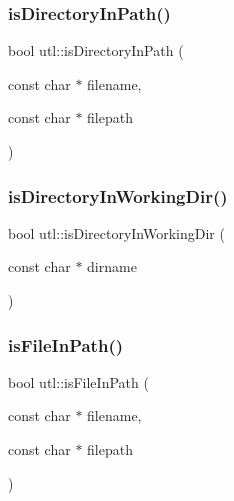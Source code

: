 \mbox{\label{namespaceutl_a974c3394d6d0a5dd2ec596d5eab86c52}} 
\subsubsection{\texorpdfstring{is\+Directory\+In\+Path()}{isDirectoryInPath()}}
{\footnotesize\ttfamily bool utl\+::is\+Directory\+In\+Path (\begin{DoxyParamCaption}\item[{const char $\ast$}]{filename,  }\item[{const char $\ast$}]{filepath }\end{DoxyParamCaption})}

\mbox{\label{namespaceutl_a45a8640044d9ad8216c1495249ce6ed1}} 
\subsubsection{\texorpdfstring{is\+Directory\+In\+Working\+Dir()}{isDirectoryInWorkingDir()}}
{\footnotesize\ttfamily bool utl\+::is\+Directory\+In\+Working\+Dir (\begin{DoxyParamCaption}\item[{const char $\ast$}]{dirname }\end{DoxyParamCaption})}

\mbox{\label{namespaceutl_a65f2cad7adb77020d86898720bde9b9c}} 
\subsubsection{\texorpdfstring{is\+File\+In\+Path()}{isFileInPath()}}
{\footnotesize\ttfamily bool utl\+::is\+File\+In\+Path (\begin{DoxyParamCaption}\item[{const char $\ast$}]{filename,  }\item[{const char $\ast$}]{filepath }\end{DoxyParamCaption})}

\mbox{\label{namespaceutl_ad8dd27d1a79413de101202470970755c}} 
